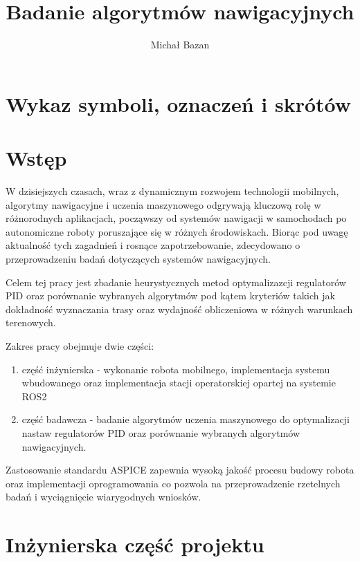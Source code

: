 \documentclass[12pt,twoside]{article}
\author{Michał Bazan}
\title{Badanie algorytmów nawigacyjnych}
\begin{document}
\maketitle

\blankpage

\tableofcontents

\clearpage
\blankpage


\section*{Wykaz symboli, oznaczeń i skrótów}


\section{Wstęp}
W dzisiejszych czasach, wraz z dynamicznym rozwojem technologii mobilnych, algorytmy nawigacyjne i uczenia maszynowego \cite{deepLearning} odgrywają kluczową rolę w różnorodnych aplikacjach, począwszy od systemów nawigacji w samochodach po autonomiczne roboty poruszające się w różnych środowiskach. Biorąc pod uwagę aktualność tych zagadnień i rosnące zapotrzebowanie, zdecydowano o przeprowadzeniu badań dotyczących systemów nawigacyjnych.
   
Celem tej pracy jest zbadanie heurystycznych metod \cite{genetics} optymalizazcji regulatorów PID oraz porównanie wybranych algorytmów pod kątem kryteriów takich jak dokładność wyznaczania trasy oraz wydajność obliczeniowa w różnych warunkach terenowych.  

Zakres pracy obejmuje dwie części:
\begin{enumerate}[label=\alph*), leftmargin=1.25cm]
	\item część inżynierska - wykonanie robota mobilnego, implementacja systemu wbudowanego oraz implementacja stacji operatorskiej opartej na systemie ROS2 \cite{ros}
	\item część badawcza - badanie algorytmów uczenia maszynowego do optymalizacji nastaw regulatorów PID oraz porównanie wybranych algorytmów nawigacyjnych. 
\end{enumerate}

Zastosowanie standardu ASPICE \cite{SPICE} zapewnia wysoką jakość procesu budowy robota oraz implementacji oprogramowania co pozwola na przeprowadzenie rzetelnych badań i wyciągnięcie wiarygodnych wniosków.

\section{Inżynierska część projektu}
\end{document}
